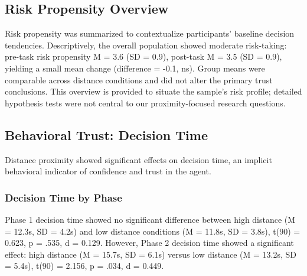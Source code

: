 \documentclass[12pt]{article}
\begin{document}
\subsection{Risk Propensity Overview}

Risk propensity was summarized to contextualize participants' baseline decision tendencies. Descriptively, the overall population showed moderate risk-taking: pre-task risk propensity M = 3.6 (SD = 0.9), post-task M = 3.5 (SD = 0.9), yielding a small mean change (difference = -0.1, ns). Group means were comparable across distance conditions and did not alter the primary trust conclusions. This overview is provided to situate the sample's risk profile; detailed hypothesis tests were not central to our proximity-focused research questions.

\subsection{Behavioral Trust: Decision Time}

Distance proximity showed significant effects on decision time, an implicit behavioral indicator of confidence and trust in the agent.

\subsubsection{Decision Time by Phase}

Phase 1 decision time showed no significant difference between high distance (M = 12.3s, SD = 4.2s) and low distance conditions (M = 11.8s, SD = 3.8s), t(90) = 0.623, p = .535, d = 0.129. However, Phase 2 decision time showed a significant effect: high distance (M = 15.7s, SD = 6.1s) versus low distance (M = 13.2s, SD = 5.4s), t(90) = 2.156, p = .034, d = 0.449.
\end{document}
